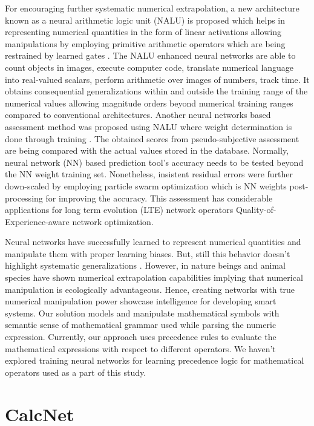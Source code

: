 \documentclass[conference]{IEEEtran}
\begin{document}
For encouraging further systematic numerical extrapolation, a new architecture known as a neural arithmetic logic unit (NALU) is proposed which helps in representing numerical quantities in the form of linear activations allowing manipulations by employing primitive arithmetic operators which are being restrained by learned gates \cite{b5}. The NALU enhanced neural networks are able to count objects in images, execute computer code, translate numerical language into real-valued scalars, perform arithmetic over images of numbers, track time. It obtains consequential generalizations within and outside the training range of the numerical values allowing magnitude orders beyond numerical training ranges compared to conventional architectures. Another neural networks based assessment method was proposed using NALU where weight determination is done through training \cite{b13}. The obtained scores from pseudo-subjective assessment are being compared with the actual values stored in the database. Normally, neural network (NN) based prediction tool's accuracy needs to be tested beyond the NN weight training set. Nonetheless, insistent residual errors were further down-scaled by employing particle swarm optimization which is NN weights post-processing for improving the accuracy. This assessment has considerable applications for long term evolution (LTE) network operators Quality-of-Experience-aware network optimization.

Neural networks have successfully learned to represent numerical quantities and manipulate them with proper learning biases. But, still this behavior doesn't highlight systematic generalizations \cite{b3, b4}. However, in nature beings and animal species have shown numerical extrapolation capabilities \cite{b10, b11} implying that numerical manipulation is ecologically advantageous. Hence, creating networks with true numerical manipulation power showcase intelligence for developing smart systems.
Our solution models and manipulate mathematical symbols with semantic sense of mathematical grammar used while parsing the numeric expression.
Currently, our approach uses precedence rules to evaluate the mathematical expressions with respect to different operators. We haven't explored training neural networks for learning precedence logic for mathematical operators used as a part of this study.

\section{CalcNet}
\end{document}
